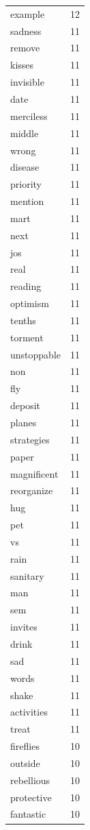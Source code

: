 \begin{tabular}{lr}
example & 12 \\
sadness & 11 \\
remove & 11 \\
kisses & 11 \\
invisible & 11 \\
date & 11 \\
merciless & 11 \\
middle & 11 \\
wrong & 11 \\
disease & 11 \\
priority & 11 \\
mention & 11 \\
mart & 11 \\
next & 11 \\
jos & 11 \\
real & 11 \\
reading & 11 \\
optimism & 11 \\
tenths & 11 \\
torment & 11 \\
unstoppable & 11 \\
non & 11 \\
fly & 11 \\
deposit & 11 \\
planes & 11 \\
strategies & 11 \\
paper & 11 \\
magnificent & 11 \\
reorganize & 11 \\
hug & 11 \\
pet & 11 \\
vs & 11 \\
rain & 11 \\
sanitary & 11 \\
man & 11 \\
sem & 11 \\
invites & 11 \\
drink & 11 \\
sad & 11 \\
words & 11 \\
shake & 11 \\
activities & 11 \\
treat & 11 \\
fireflies & 10 \\
outside & 10 \\
rebellious & 10 \\
protective & 10 \\
fantastic & 10 \\

\end{tabular}
